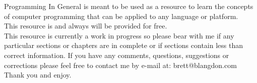 Programming In General is meant to be used as a resource to learn the concepts of computer programming that can be applied to any
language or platform.
\newline
\\
This resource is and always will be provided for free.
\newline
\\
This resource is currently a work in progress so please bear with me if any particular sections or chapters are in complete or
if sections contain less than correct information.
If you have any comments, questions, suggestions or corrections please feel free to contact me by e-mail at:
\newline
brett@blangdon.com
\newline
\\
Thank you and enjoy.
\pagebreak

